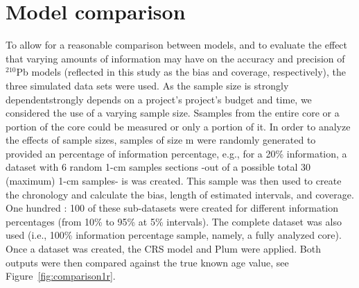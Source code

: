 \documentclass [10pt] {article}
\newcommand{\ac}{\color{red} }  %
\newcommand{\ca}{\color{black}} %
\begin{document}
\section{Model comparison}

To allow for a reasonable comparison between models, and to evaluate the effect that varying amounts of information may have on the accuracy and precision of $^{210}$Pb models (reflected in this study as the bias and coverage, respectively), the three simulated data sets were used. 
As the sample size is strongly dependentstrongly depends on a project’s project's budget and time, we considered the use of a varying sample size. Ssamples from the entire core or a portion of the core could be measured or only a portion of it. In order to analyze the effects of sample sizes, samples of size m were randomly generated to provided an  percentage of information percentage, e.g., for a 20\% information, a dataset with 6 random 1-cm samples sections -out of a possible total 30 (maximum) 1-cm samples- is was created. This sample was then used to create the chronology and calculate the bias, length of estimated intervals, and coverage. One hundred : 100 of these sub-datasets were created for different information percentages (from 10\% to 95\% at 5\% intervals). 
The complete dataset was also used (i.e., 100\% information percentage sample, namely, a fully analyzed core).
Once a dataset was created, the CRS model and Plum were applied. %
Both outputs were then compared against the true known age value, see Figure~\ref{fig:comparison1r}.
\end{document}
